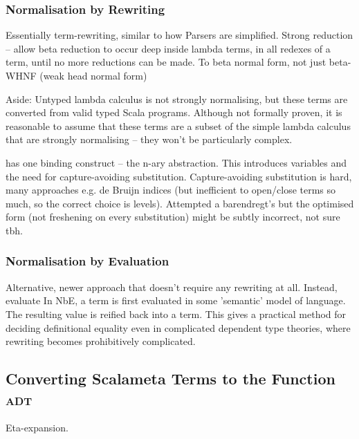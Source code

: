 \documentclass[../../main.tex]{subfiles}
\begin{document}
\subsubsection{Normalisation by Rewriting}
Essentially term-rewriting, similar to how Parsers are simplified.
Strong reduction -- allow beta reduction to occur deep inside lambda terms, in all redexes of a term, until no more reductions can be made.
To beta normal form, not just beta-WHNF (weak head normal form) %

Aside: Untyped lambda calculus is not strongly normalising, but these terms are converted from valid typed Scala programs.
Although not formally proven, it is reasonable to assume that these terms are a subset of the simple lambda calculus that are strongly normalising -- they won't be particularly complex.

 has one binding construct -- the n-ary abstraction. This introduces variables and the need for capture-avoiding substitution.
Capture-avoiding substitution is hard, many approaches e.g. de Bruijn indices (but inefficient to open/close terms so much, so the correct choice is levels).
Attempted a barendregt's but the optimised form (not freshening on every substitution) might be subtly incorrect, not sure tbh.

\subsubsection{Normalisation by Evaluation}
Alternative, newer approach that doesn't require any rewriting at all.
Instead, evaluate 
In NbE, a term is first evaluated in some 'semantic' model of language. The resulting value is reified back into a term. This gives a practical method for deciding definitional equality even in complicated dependent type theories, where rewriting becomes prohibitively complicated.

\subsection{Converting Scalameta Terms to the Function \textsc{adt}}
Eta-expansion.
\end{document}
